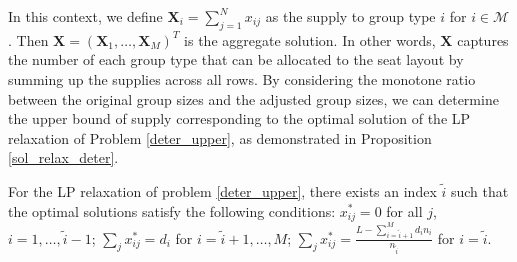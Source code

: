 In this context, we define $\bm{X}_i= \sum_{j=1}^{N} x_{ij}$ as the supply to group type $i$ for $i \in \mathcal{M}$. Then $\bm{X} = (\bm{X}_{1}, \ldots, \bm{X}_{M})^T$ is the aggregate solution. In other words, $\bm{X}$ captures the number of each group type that can be allocated to the seat layout by summing up the supplies across all rows. By considering the monotone ratio between the original group sizes and the adjusted group sizes, we can determine the upper bound of supply corresponding to the optimal solution of the LP relaxation of Problem \eqref{deter_upper}, as demonstrated in Proposition \ref{sol_relax_deter}.






\begin{prop}\label{sol_relax_deter}
For the LP relaxation of problem \eqref{deter_upper}, there exists an index $\tilde{i}$ such that the optimal solutions satisfy the following conditions: $x_{ij}^{*} = 0$ for all $j$, $i = 1,\ldots, \tilde{i}-1$; $\sum_{j} x_{ij}^{*} = d_{i}$ for $i = \tilde{i}+1,\ldots, M$; $\sum_{j} x_{ij}^{*} = \frac{L - \sum_{i = \tilde{i}+1}^{M} {d_i n_i}}{n_{\tilde{i}}}$ for $i = \tilde{i}$.
\end{prop}

